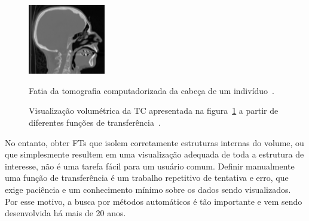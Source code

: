 \begin{figure}[h]
	\centering
	\includegraphics[width=0.3\textwidth]{images/head_ct_slice_intro}%
    \label{fig:head_ct_slice_intro}%
    \caption{Fatia da tomografia computadorizada da cabeça de um indivíduo~\cite{gordonms}.}
\end{figure}
\begin{figure}[h]
	\centering
    \caption{Visualização volumétrica da TC apresentada na figura~\ref{fig:head_ct_slice_intro} a partir de diferentes funções de transferência~\cite{gordonms}.}
\end{figure}
    
    No entanto, obter FTs que isolem corretamente estruturas internas do volume, ou que simplesmente resultem em uma visualização adequada de toda a estrutura de interesse, não é uma tarefa fácil para um usuário comum. Definir manualmente uma função de transferência é um trabalho repetitivo de tentativa e erro, que exige paciência e um conhecimento mínimo sobre os dados sendo visualizados. Por esse motivo, a busca por métodos automáticos é tão importante e vem sendo desenvolvida há mais de 20 anos.
    
